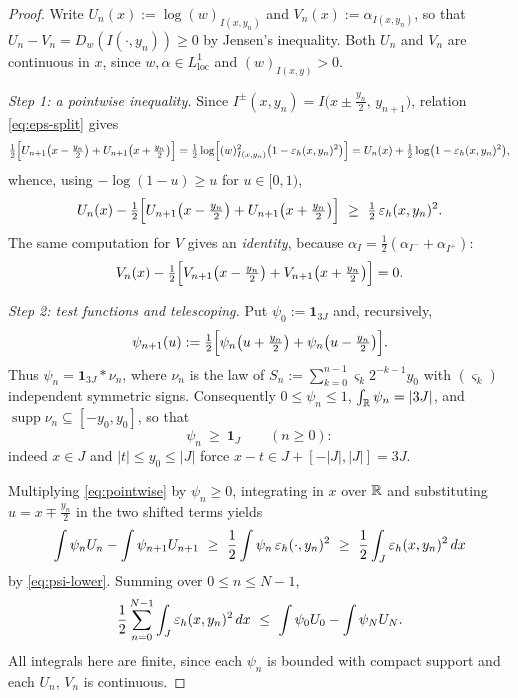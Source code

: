 \begin{proof}
	Write $U_n(x):=\log(w)_{I(x,y_n)}$ and $V_n(x):=\alpha_{I(x,y_n)}$, so that
	$U_n-V_n=D_w(I(\cdot,y_n))\ge0$ by Jensen's inequality. Both $U_n$ and $V_n$
	are continuous in $x$, since $w,\alpha\in L^1_{\mathrm{loc}}$ and
	$(w)_{I(x,y)}>0$.
	
	\medskip
	\noindent\textit{Step 1: a pointwise inequality.}
	Since $I^{\pm}(x,y_n)=I\bigl(x\pm\tfrac{y_n}2,\,y_{n+1}\bigr)$, relation
	\eqref{eq:eps-split} gives
	\[
	\tfrac12\Bigl[U_{n+1}\bigl(x-\tfrac{y_n}2\bigr)+U_{n+1}\bigl(x+\tfrac{y_n}2\bigr)\Bigr]
	=\tfrac12\log\Bigl[(w)_{I(x,y_n)}^2\bigl(1-\varepsilon_h(x,y_n)^2\bigr)\Bigr]
	=U_n(x)+\tfrac12\log\bigl(1-\varepsilon_h(x,y_n)^2\bigr),
	\]
	whence, using $-\log(1-u)\ge u$ for $u\in[0,1)$,
	\begin{equation}\label{eq:pointwise}
		U_n(x)-\tfrac12\Bigl[U_{n+1}\bigl(x-\tfrac{y_n}2\bigr)
		+U_{n+1}\bigl(x+\tfrac{y_n}2\bigr)\Bigr]\ \ge\ \tfrac12\,\eps_h(x,y_n)^2 .
	\end{equation}
	The same computation for $V$ gives an \emph{identity}, because
	$\alpha_{I}=\tfrac12(\alpha_{I^-}+\alpha_{I^+})$:
	\begin{equation}\label{eq:pointwise-V}
		V_n(x)-\tfrac12\Bigl[V_{n+1}\bigl(x-\tfrac{y_n}2\bigr)
		+V_{n+1}\bigl(x+\tfrac{y_n}2\bigr)\Bigr]=0 .
	\end{equation}
	
	\medskip
	\noindent\textit{Step 2: test functions and telescoping.}
	Put $\psi_0:=\mathbf 1_{3J}$ and, recursively,
	\[
	\psi_{n+1}(u):=\tfrac12\Bigl[\psi_n\bigl(u+\tfrac{y_n}2\bigr)
	+\psi_n\bigl(u-\tfrac{y_n}2\bigr)\Bigr].
	\]
	Thus $\psi_n=\mathbf 1_{3J}*\nu_n$, where $\nu_n$ is the law of
	$S_n:=\sum_{k=0}^{n-1}\varsigma_k2^{-k-1}y_0$ with $(\varsigma_k)$ independent
	symmetric signs. Consequently $0\le\psi_n\le1$, $\int_{\mathbb{R}}\psi_n=|3J|$, and
	$\operatorname{supp}\nu_n\subseteq[-y_0,y_0]$, so that
	\begin{equation}\label{eq:psi-lower}
		\psi_n\ \ge\ \mathbf 1_J\qquad(n\ge0):
	\end{equation}
	indeed $x\in J$ and $|t|\le y_0\le|J|$ force $x-t\in J+[-|J|,|J|]=3J$.
	
	Multiplying \eqref{eq:pointwise} by $\psi_n\ge0$, integrating in $x$ over $\mathbb{R}$
	and substituting $u=x\mp\tfrac{y_n}2$ in the two shifted terms yields
	\[
	\int\psi_nU_n-\int\psi_{n+1}U_{n+1}
	\ \ge\ \frac12\int\psi_n\,\varepsilon_h(\cdot,y_n)^2
	\ \ge\ \frac12\int_J\varepsilon_h(x,y_n)^2\,dx
	\]
	by \eqref{eq:psi-lower}. Summing over $0\le n\le N-1$,
	\begin{equation}\label{eq:telescope}
		\frac12\sum_{n=0}^{N-1}\int_J\varepsilon_h(x,y_n)^2\,dx
		\ \le\ \int\psi_0U_0-\int\psi_NU_N .
	\end{equation}
	All integrals here are finite, since each $\psi_n$ is bounded with compact
	support and each $U_n$, $V_n$ is continuous.
	

\end{proof}

